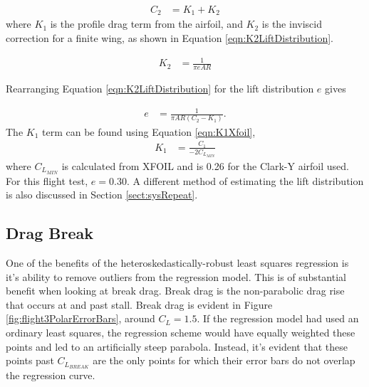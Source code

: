 \begin{align}
C_2 &= K_1 + K_2
\end{align}
where $K_1$ is the profile drag term from the airfoil, and $K_2$ is the inviscid correction for a finite wing, as shown in Equation \ref{eqn:K2LiftDistribution}.

\begin{align}
\label{eqn:K2LiftDistribution}
K_2 &= \frac{1}{\pi eAR}
\end{align}

Rearranging Equation \ref{eqn:K2LiftDistribution} for the lift distribution $e$ gives

\begin{align}
e &= \frac{1}{\pi AR(C_2-K_1)}.
\end{align}
The $K_1$ term can be found using Equation \ref{eqn:K1Xfoil},
\begin{align}
\label{eqn:K1Xfoil}
K_1 &= \frac{C_1}{-2C_{L_{MIN}}}
\end{align}
where $C_{L_{MIN}}$ is calculated from XFOIL and is 0.26 for the Clark-Y airfoil used. For this flight test, $e = 0.30$. A different method of estimating the lift distribution is also discussed in Section \ref{sect:sysRepeat}.

\subsection{Drag Break}
One of the benefits of the heteroskedastically-robust least squares regression is it's ability to remove outliers from the regression model. This is of substantial benefit when looking at break drag. Break drag is the non-parabolic drag rise that occurs at and past stall. Break drag is evident in Figure \ref{fig:flight3PolarErrorBars}, around $C_L = 1.5$. If the regression model had used an ordinary least squares, the regression scheme would have equally weighted these points and led to an artificially steep parabola. Instead, it's evident that these points past $C_{L_{BREAK}}$ are the only points for which their error bars do not overlap the regression curve.
